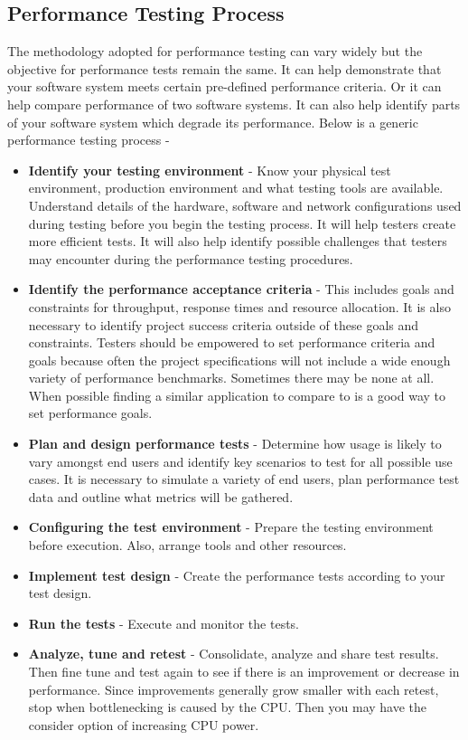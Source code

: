 \documentclass[../thesis.tex]{subfiles}
\begin{document}
\subsection*{Performance Testing Process}
The methodology adopted for performance testing can vary widely but the objective for performance tests remain the same. It can help demonstrate that your software system meets certain pre-defined performance criteria. Or it can help compare performance of two software systems. It can also help identify parts of your software system which degrade its performance.
\vspace{5mm}
Below is a generic performance testing process -
\vspace{5mm} 
\begin{itemize}
\item \textbf{Identify your testing environment} - Know your physical test environment, production environment and what testing tools are available. Understand details of the hardware, software and network configurations used during testing before you begin the testing process. It will help testers create more efficient tests.  It will also help identify possible challenges that testers may encounter during the performance testing procedures.
\vspace{5mm}
\item \textbf{Identify the performance acceptance criteria} - This includes goals and constraints for throughput, response times and resource allocation.  It is also necessary to identify project success criteria outside of these goals and constraints. Testers should be empowered to set performance criteria and goals because often the project specifications will not include a wide enough variety of performance benchmarks. Sometimes there may be none at all. When possible finding a similar application to compare to is a good way to set performance goals.
\vspace{5mm}
\item \textbf{Plan and design performance tests} - Determine how usage is likely to vary amongst end users and identify key scenarios to test for all possible use cases. It is necessary to simulate a variety of end users, plan performance test data and outline what metrics will be gathered.
\vspace{5mm}
\item \textbf{Configuring the test environment} - Prepare the testing environment before execution. Also, arrange tools and other resources.
\vspace{5mm}
\item \textbf{Implement test design} - Create the performance tests according to your test design.
\vspace{5mm}
\item \textbf{Run the tests} - Execute and monitor the tests.
\vspace{5mm}
\item \textbf{Analyze, tune and retest} - Consolidate, analyze and share test results. Then fine tune and test again to see if there is an improvement or decrease in performance. Since improvements generally grow smaller with each retest, stop when bottlenecking is caused by the CPU. Then you may have the consider option of increasing CPU power.
\end{itemize}
\end{document}

